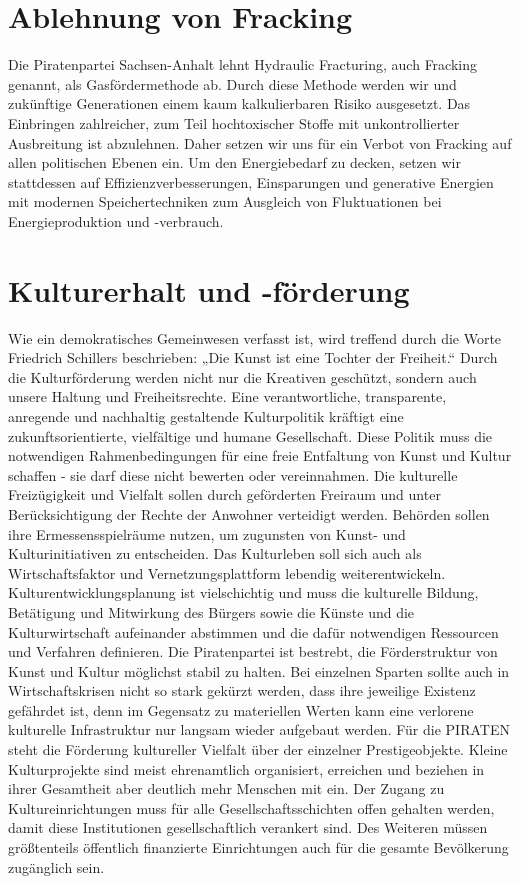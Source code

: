 \section{Ablehnung von Fracking}

Die Piratenpartei Sachsen-Anhalt lehnt Hydraulic Fracturing, auch Fracking
genannt, als Gasfördermethode ab. Durch diese Methode werden wir und zukünftige
Generationen einem kaum kalkulierbaren Risiko ausgesetzt. Das Einbringen
zahlreicher, zum Teil hochtoxischer Stoffe mit unkontrollierter Ausbreitung ist
abzulehnen. Daher setzen wir uns für ein Verbot von Fracking auf allen
politischen Ebenen ein. Um den Energiebedarf zu decken, setzen wir stattdessen
auf Effizienzverbesserungen, Einsparungen und generative Energien mit modernen
Speichertechniken zum Ausgleich von Fluktuationen bei Energieproduktion und
-verbrauch.

\section{Kulturerhalt und -förderung}

Wie ein demokratisches Gemeinwesen verfasst ist, wird treffend durch die Worte
Friedrich Schillers beschrieben: „Die Kunst ist eine Tochter der Freiheit.“
Durch die Kulturförderung werden nicht nur die Kreativen geschützt, sondern auch
unsere Haltung und Freiheitsrechte. Eine verantwortliche, transparente,
anregende und nachhaltig gestaltende Kulturpolitik kräftigt eine
zukunftsorientierte, vielfältige und humane Gesellschaft. Diese Politik muss die
notwendigen Rahmenbedingungen für eine freie Entfaltung von Kunst und Kultur
schaffen - sie darf diese nicht bewerten oder vereinnahmen.
Die kulturelle Freizügigkeit und Vielfalt sollen durch geförderten Freiraum und
unter Berücksichtigung der Rechte der Anwohner verteidigt werden. Behörden
sollen ihre Ermessensspielräume nutzen, um zugunsten von Kunst- und
Kulturinitiativen zu entscheiden. Das Kulturleben soll sich auch als
Wirtschaftsfaktor und Vernetzungsplattform lebendig weiterentwickeln.
Kulturentwicklungsplanung ist vielschichtig und muss die kulturelle Bildung,
Betätigung und Mitwirkung des Bürgers sowie die Künste und die Kulturwirtschaft
aufeinander abstimmen und die dafür notwendigen Ressourcen und Verfahren
definieren. Die Piratenpartei ist bestrebt, die Förderstruktur von Kunst und
Kultur möglichst stabil zu halten. Bei einzelnen Sparten sollte auch in
Wirtschaftskrisen nicht so stark gekürzt werden, dass ihre jeweilige Existenz
gefährdet ist, denn im Gegensatz zu materiellen Werten kann eine verlorene
kulturelle Infrastruktur nur langsam wieder aufgebaut werden.
Für die PIRATEN steht die Förderung kultureller Vielfalt über der einzelner
Prestigeobjekte. Kleine Kulturprojekte sind meist ehrenamtlich organisiert,
erreichen und beziehen in ihrer Gesamtheit aber deutlich mehr Menschen mit ein.
Der Zugang zu Kultureinrichtungen muss für alle Gesellschaftsschichten offen
gehalten werden, damit diese Institutionen gesellschaftlich verankert sind. Des
Weiteren müssen größtenteils öffentlich finanzierte Einrichtungen auch für die
gesamte Bevölkerung zugänglich sein.

